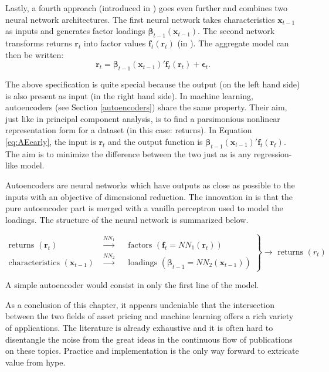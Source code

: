 \documentclass[]{krantz}
\theoremstyle{definition}
\theoremstyle{definition}
\theoremstyle{definition}
\theoremstyle{remark}
\begin{document}
Lastly, a fourth approach (introduced in \citet{gu2019autoencoder}) goes
even further and combines two neural network architectures. The first
neural network takes characteristics \(\textbf{x}_{t-1}\) as inputs and
generates factor loadings
\(\boldsymbol{\beta}_{t-1}(\textbf{x}_{t-1})\). The second network
transforms returns \(\textbf{r}_t\) into factor values
\(\textbf{f}_t(\textbf{r}_t)\) (in \citet{feng2019deep}). The aggregate
model can then be written: \begin{equation}
\label{eq:AEearly}
\textbf{r}_t=\boldsymbol{\beta}_{t-1}(\textbf{x}_{t-1})'\textbf{f}_t(\textbf{r}_t)+\boldsymbol{\epsilon}_t.
\end{equation}

The above specification is quite special because the output (on the left
hand side) is also present as input (in the right hand side). In machine
learning, autoencoders (see Section \ref{autoencoders}) share the same
property. Their aim, just like in principal component analysis, is to
find a parsimonious nonlinear representation form for a dataset (in this
case: returns). In Equation \eqref{eq:AEearly}, the input is
\(\textbf{r}_t\) and the output function is
\(\boldsymbol{\beta}_{t-1}(\textbf{x}_{t-1})'\textbf{f}_t(\textbf{r}_t)\).
The aim is to minimize the difference between the two just as is any
regression-like model.

Autoencoders are neural networks which have outputs as close as possible
to the inputs with an objective of dimensional reduction. The innovation
in \citet{gu2019autoencoder} is that the pure autoencoder part is merged
with a vanilla perceptron used to model the loadings. The structure of
the neural network is summarized below.

\[\left. \begin{array}{rl}
\text{returns } (\textbf{r}_t) & \overset{NN_1}{\longrightarrow} \quad \text{ factors } (\textbf{f}_t=NN_1(\textbf{r}_t)) \\
\text{characteristics } (\textbf{x}_{t-1}) & \overset{NN_2}{\longrightarrow} \quad \text{ loadings } (\boldsymbol{\beta}_{t-1}=NN_2(\textbf{x}_{t-1}))
\end{array} \right\} \longrightarrow \text{ returns } (r_t)\]

A simple autoencoder would consist in only the first line of the model.

As a conclusion of this chapter, it appears undeniable that the
intersection between the two fields of asset pricing and machine
learning offers a rich variety of applications. The literature is
already exhaustive and it is often hard to disentangle the noise from
the great ideas in the continuous flow of publications on these topics.
Practice and implementation is the only way forward to extricate value
from hype.
\end{document}
